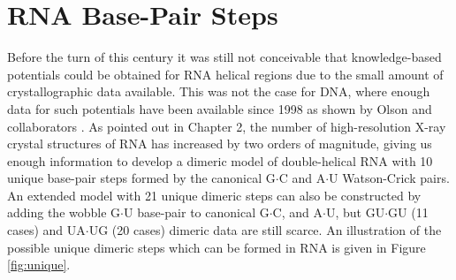 \chapter{RNA Base-Pair Steps}
\label{basepairsteps} 

Before  the turn of  this century  it was  still not  conceivable that
knowledge-based potentials  could be obtained for  RNA helical regions
due to the  small amount of crystallographic data  available. This was
not the case for DNA, where  enough data for such potentials have been
available   since   1998  as   shown   by   Olson  and   collaborators
\cite{olson1998}.   As  pointed  out  in  Chapter  2,  the  number  of
high-resolution X-ray  crystal structures of RNA has  increased by two
orders of magnitude, giving us enough information to develop a dimeric
model of double-helical  RNA with 10 unique base-pair  steps formed by
the canonical G$\cdot$C and A$\cdot$U Watson-Crick pairs.  An extended
model with 21  unique dimeric steps can also  be constructed by adding
the wobble G$\cdot$U base-pair  to canonical G$\cdot$C, and A$\cdot$U,
but GU$\cdot$GU (11 cases) and UA$\cdot$UG (20 cases) dimeric data are
still  scarce. An illustration  of the  possible unique  dimeric steps
which can be formed in RNA is given in Figure \ref{fig:unique}.

